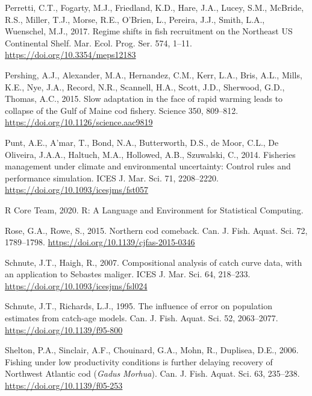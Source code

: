 \documentclass[]{article}
\begin{document}
\leavevmode\hypertarget{ref-perretti2017Regime}{}%
Perretti, C.T., Fogarty, M.J., Friedland, K.D., Hare, J.A., Lucey, S.M.,
McBride, R.S., Miller, T.J., Morse, R.E., O'Brien, L., Pereira, J.J.,
Smith, L.A., Wuenschel, M.J., 2017. Regime shifts in fish recruitment on
the Northeast US Continental Shelf. Mar. Ecol. Prog. Ser. 574, 1--11.
\url{https://doi.org/10.3354/meps12183}

\leavevmode\hypertarget{ref-pershing2015Slow}{}%
Pershing, A.J., Alexander, M.A., Hernandez, C.M., Kerr, L.A., Bris,
A.L., Mills, K.E., Nye, J.A., Record, N.R., Scannell, H.A., Scott, J.D.,
Sherwood, G.D., Thomas, A.C., 2015. Slow adaptation in the face of rapid
warming leads to collapse of the Gulf of Maine cod fishery. Science 350,
809--812. \url{https://doi.org/10.1126/science.aac9819}

\leavevmode\hypertarget{ref-punt2014Fisheries}{}%
Punt, A.E., A'mar, T., Bond, N.A., Butterworth, D.S., de Moor, C.L., De
Oliveira, J.A.A., Haltuch, M.A., Hollowed, A.B., Szuwalski, C., 2014.
Fisheries management under climate and environmental uncertainty:
Control rules and performance simulation. ICES J. Mar. Sci. 71,
2208--2220. \url{https://doi.org/10.1093/icesjms/fst057}

\leavevmode\hypertarget{ref-rcoreteam2020Language}{}%
R Core Team, 2020. R: A Language and Environment for Statistical
Computing.

\leavevmode\hypertarget{ref-rose2015Northern}{}%
Rose, G.A., Rowe, S., 2015. Northern cod comeback. Can. J. Fish. Aquat.
Sci. 72, 1789--1798. \url{https://doi.org/10.1139/cjfas-2015-0346}

\leavevmode\hypertarget{ref-schnute2007Compositional}{}%
Schnute, J.T., Haigh, R., 2007. Compositional analysis of catch curve
data, with an application to Sebastes maliger. ICES J. Mar. Sci. 64,
218--233. \url{https://doi.org/10.1093/icesjms/fsl024}

\leavevmode\hypertarget{ref-schnute1995Influence}{}%
Schnute, J.T., Richards, L.J., 1995. The influence of error on
population estimates from catch-age models. Can. J. Fish. Aquat. Sci.
52, 2063--2077. \url{https://doi.org/10.1139/f95-800}

\leavevmode\hypertarget{ref-shelton2006Fishing}{}%
Shelton, P.A., Sinclair, A.F., Chouinard, G.A., Mohn, R., Duplisea,
D.E., 2006. Fishing under low productivity conditions is further
delaying recovery of Northwest Atlantic cod (\emph{Gadus}
\emph{Morhua}). Can. J. Fish. Aquat. Sci. 63, 235--238.
\url{https://doi.org/10.1139/f05-253}
\end{document}

